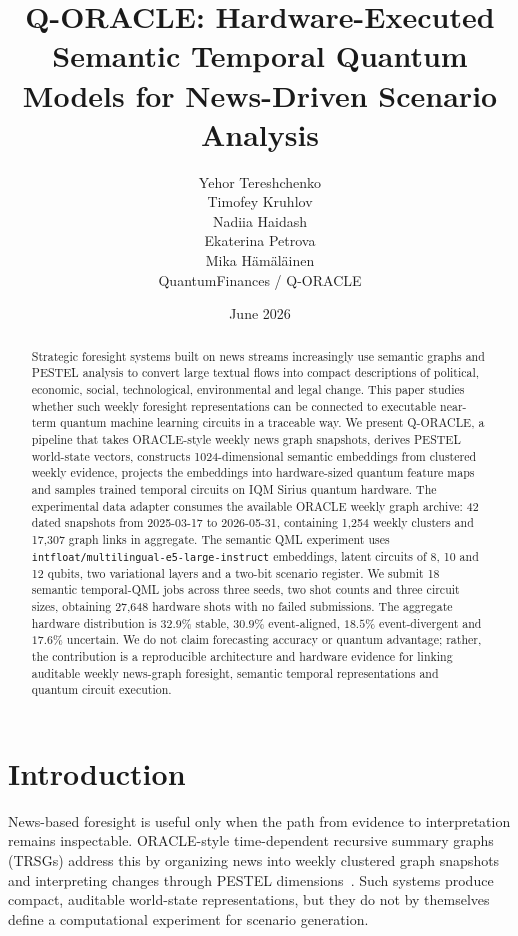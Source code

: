 \documentclass[10pt,twocolumn]{article}
\title{\vspace{-1.0em}Q-ORACLE: Hardware-Executed Semantic Temporal Quantum Models for News-Driven Scenario Analysis}
\author{Yehor Tereshchenko \\ Timofey Kruhlov \\ Nadiia Haidash \\ Ekaterina Petrova \\ Mika Hämäläinen \\[0.35em] \small QuantumFinances / Q-ORACLE}
\date{June 2026}
\begin{document}
\maketitle

\begin{abstract}
Strategic foresight systems built on news streams increasingly use semantic graphs and PESTEL analysis to convert large textual flows into compact descriptions of political, economic, social, technological, environmental and legal change. This paper studies whether such weekly foresight representations can be connected to executable near-term quantum machine learning circuits in a traceable way. We present Q-ORACLE, a pipeline that takes ORACLE-style weekly news graph snapshots, derives PESTEL world-state vectors, constructs 1024-dimensional semantic embeddings from clustered weekly evidence, projects the embeddings into hardware-sized quantum feature maps and samples trained temporal circuits on IQM Sirius quantum hardware. The experimental data adapter consumes the available ORACLE weekly graph archive: 42 dated snapshots from 2025-03-17 to 2026-05-31, containing 1,254 weekly clusters and 17,307 graph links in aggregate. The semantic QML experiment uses \texttt{intfloat/multilingual-e5-large-instruct} embeddings, latent circuits of 8, 10 and 12 qubits, two variational layers and a two-bit scenario register. We submit 18 semantic temporal-QML jobs across three seeds, two shot counts and three circuit sizes, obtaining 27,648 hardware shots with no failed submissions. The aggregate hardware distribution is \(32.9\%\) stable, \(30.9\%\) event-aligned, \(18.5\%\) event-divergent and \(17.6\%\) uncertain. We do not claim forecasting accuracy or quantum advantage; rather, the contribution is a reproducible architecture and hardware evidence for linking auditable weekly news-graph foresight, semantic temporal representations and quantum circuit execution.
\end{abstract}

\section{Introduction}
News-based foresight is useful only when the path from evidence to interpretation remains inspectable. ORACLE-style time-dependent recursive summary graphs (TRSGs) address this by organizing news into weekly clustered graph snapshots and interpreting changes through PESTEL dimensions~\cite{oracle2025}. Such systems produce compact, auditable world-state representations, but they do not by themselves define a computational experiment for scenario generation.
\end{document}
